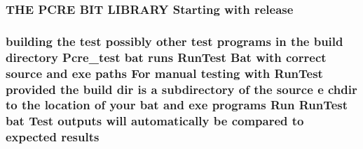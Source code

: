 \subsubsection[{\texorpdfstring{release}{release}}]{\setlength{\rightskip}{0pt plus 5cm}T\+HE {\bf P\+C\+RE} {\bf B\+IT} L\+I\+B\+R\+A\+RY Starting {\bf with} release}\hypertarget{NON-AUTOTOOLS-BUILD_8txt_a3e0085f0d21ea40d58533b96194b8d06}{}\label{NON-AUTOTOOLS-BUILD_8txt_a3e0085f0d21ea40d58533b96194b8d06}
\subsubsection[{\texorpdfstring{results}{results}}]{\setlength{\rightskip}{0pt plus 5cm}building the test possibly other test programs {\bf in} the build {\bf directory} Pcre\+\_\+test {\bf bat} runs Run\+Test Bat {\bf with} correct {\bf source} and {\bf exe} paths For manual testing {\bf with} Run\+Test provided the build {\bf dir} {\bf is} {\bf a} subdirectory {\bf of} the {\bf source} {\bf e} chdir {\bf to} the {\bf location} {\bf of} your {\bf bat} and {\bf exe} programs Run Run\+Test {\bf bat} Test outputs will automatically {\bf be} compared {\bf to} {\bf expected} results}\hypertarget{NON-AUTOTOOLS-BUILD_8txt_a9237582cb59392bdaeda6c248df4441c}{}\label{NON-AUTOTOOLS-BUILD_8txt_a9237582cb59392bdaeda6c248df4441c}
